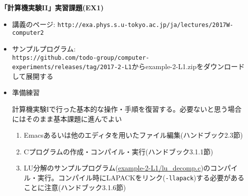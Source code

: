 \documentclass[11pt]{jarticle}
\begin{document}
\noindent
{\bf\large 「計算機実験II」実習課題(EX1)}
\\[-0.5em]

\noindent
\begin{itemize}
\item 講義のページ: \verb+http://exa.phys.s.u-tokyo.ac.jp/ja/lectures/2017W-computer2+

\item サンプルプログラム: \\ {\small \verb+https://github.com/todo-group/computer-experiments/releases/tag/2017-2-L1+}からexample-2-L1.zipをダウンロードして展開する

\item 準備練習
  
  計算機実験Iで行った基本的な操作・手順を復習する。必要ないと思う場合にはそのまま基本課題に進んでよい
  \begin{enumerate}
  \item Emacsあるいは他のエディタを用いたファイル編集(ハンドブック2.3節)
  \item Cプログラムの作成・コンパイル・実行(ハンドブック3.1.1節)
  \item LU分解のサンプルプログラム(\href{https://github.com/todo-group/computer-experiments/blob/master/exercise/linear_system/lu_decomp.c}{example-2-L1/lu\_decomp.c})のコンパイル・実行。コンパイル時にLAPACKをリンク({\tt -llapack})する必要があることに注意(ハンドブック3.1.6節)
  \end{enumerate}


\end{itemize}
\end{document}
